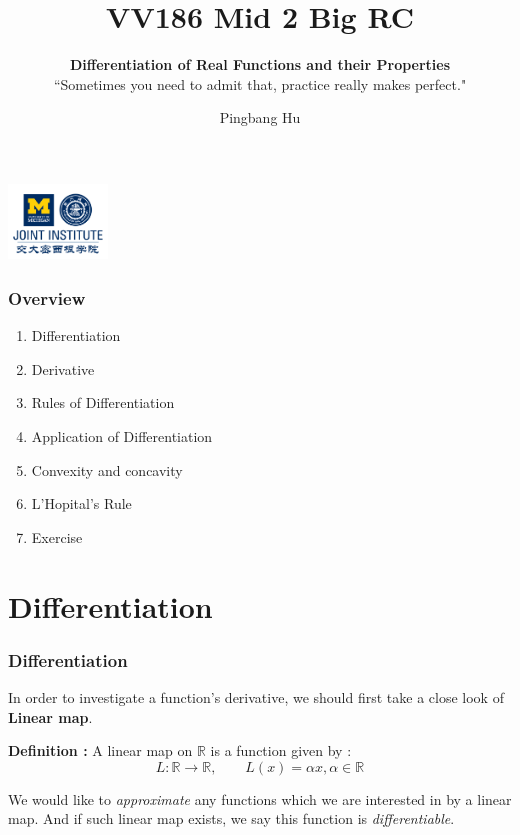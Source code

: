 \documentclass[12pt, t]{beamer}
\title{VV186 Mid 2 Big RC}
\subtitle{\textbf{Differentiation of Real Functions and their Properties}\\``Sometimes you need to admit that, practice really makes perfect."}
\institute[UM-SJTU JI]{University of Michigan-Shanghai Jiao Tong University Joint Institute}
\author{Pingbang Hu}
\renewcommand{\emph}[1]{{\color{Turquoise3}\textsl{#1}}}
\begin{document}
\begin{frame}
    \titlepage
    \begin{center}
        \includegraphics[height=2cm]{Figures/logo/logo2.png}
    \end{center}
\end{frame}

\begin{frame}
    \frametitle{Overview}
    \begin{enumerate}
        \item Differentiation
        \item Derivative
        \item Rules of Differentiation
        \item Application of Differentiation
        \item Convexity and concavity
        \item L'Hopital's Rule
        \item Exercise
    \end{enumerate}
\end{frame}

\section{Differentiation}
\begin{frame}
    \frametitle{Differentiation}

In order to investigate a function's derivative, we should first take a close look of \textbf{Linear map}.

\vspace{2em}
\textbf{Definition : } A linear map on $\mathbb{R}$ is a function given by :
\begin{equation*}
    L: \mathbb{R}\rightarrow\mathbb{R}, \qquad L(x)=\alpha x, \alpha \in \mathbb{R}
\end{equation*}

\vspace{1em}
We would like to \emph{approximate} any functions which we are interested in by a linear map. And if 
such linear map exists, we say this function is \emph{differentiable}.
\end{frame}
\end{document}
